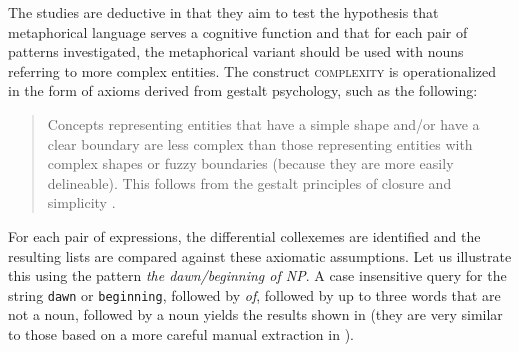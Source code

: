 The studies are deductive  in that they aim to test the hypothesis that metaphorical  language serves a cognitive  function and that for each pair of patterns investigated, the metaphorical variant should be used with nouns  referring to more complex entities. The construct \textsc{complexity} is operationalized  in the form of axioms derived from gestalt psychology,  such as the following:

\begin{quote}
Concepts representing entities that have a simple shape and\slash or have a clear boundary are less complex than those representing entities with complex shapes or fuzzy boundaries (because they are more easily delineable). This follows from the gestalt principles of closure and simplicity \citep[170]{stefanowitsch_function_2005}.
\end{quote}

For each pair of expressions, the differential collexemes  are identified and the resulting lists are compared against these axiomatic assumptions. Let us illustrate this using the pattern \textit{the dawn\slash beginning of NP}. A case insensitive query for the string \texttt{dawn} or \texttt{beginning}, followed by \textit{of}, followed by up to three words that are not a noun,  followed by a noun yields the results shown in  (they are very similar to those based on a more careful manual extraction  in \citealt{stefanowitsch_function_2005}).\largerpage


